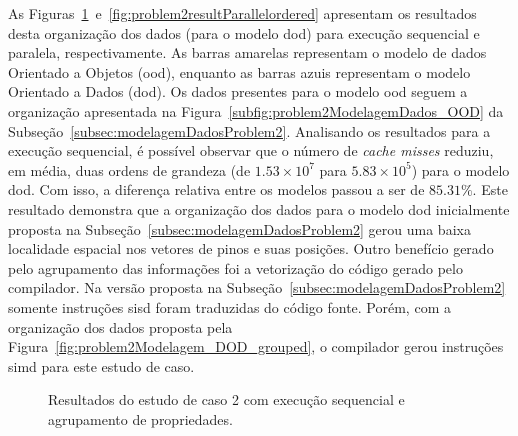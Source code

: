 As Figuras~\ref{fig:problem2resultSequencialordered}~e~\ref{fig:problem2resultParallelordered} apresentam os resultados desta organização dos dados (para o modelo \ac{dod}) para execução sequencial e paralela, respectivamente. 
As barras amarelas representam o modelo de dados Orientado a Objetos (\ac{ood}), enquanto as barras azuis representam o modelo Orientado a Dados (\ac{dod}).
Os dados presentes para o modelo \ac{ood} seguem a organização apresentada na Figura~\ref{subfig:problem2ModelagemDados_OOD} da Subseção~\ref{subsec:modelagemDadosProblem2}.
Analisando os resultados para a execução sequencial, é possível observar que o número de  \textit{cache misses} reduziu, em média, duas ordens de grandeza (de $1.53\times10^7$ para $5.83\times10^5$) para o modelo \ac{dod}. Com isso, a diferença relativa entre os modelos passou a ser de $85.31\%$. Este resultado demonstra que a organização dos dados para o modelo \ac{dod} inicialmente proposta na Subseção~\ref{subsec:modelagemDadosProblem2} gerou uma baixa localidade espacial nos vetores de pinos e suas posições.
Outro benefício gerado pelo agrupamento das informações foi a vetorização do código gerado pelo compilador. Na versão proposta na Subseção~\ref{subsec:modelagemDadosProblem2} somente instruções \ac{sisd} foram traduzidas do código fonte. Porém, com a organização dos dados proposta pela Figura~\ref{fig:problem2Modelagem_DOD_grouped}, o compilador gerou instruções \ac{simd} para este estudo de caso.

\begin{figure}[ht]
    \centering
    \caption{Resultados do estudo de caso 2 com execução sequencial e agrupamento de propriedades.}
    \label{fig:problem2resultSequencialordered}
\end{figure}

